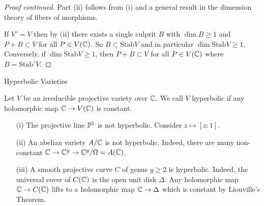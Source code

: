 \documentclass{beamer}
\begin{document}
\begin{frame}
  \begin{proof}[Proof continued]
    Part (ii) follows from (i) and a general result in the 
    dimension theory of fibers of morphisms. 

    If $V^{\circ}=V$ then by (ii) there exists a single culprit $B$ with
    $\dim B\ge 1$ and 
    $P+B\subset V$ for all $P\in V({\mathbb{C}})$. So $B\subset
    \mathrm{Stab} V$ and in particular $\dim \mathrm{Stab}V\ge 1$.
    Conversely, if $\dim \mathrm{Stab} V \ge 1$, then $P+B\subset V$
    for all $P\in V({\mathbb{C}})$ where $B=\mathrm{Stab}^{\circ} V$. 
  \end{proof}
\end{frame}

\begin{frame}{Hyperbolic Varieties}
  \begin{definition}
    Let $V$ be an irreducible projective variety over ${\mathbb{C}}$.
    We call $V$ \alert{hyperbolic} if
    any holomorphic map ${\mathbb{C}} \rightarrow V({\mathbb{C}})$ is
    constant.
  \end{definition}

  \begin{example}
    \begin{enumerate}
    \item [(i)]    The projective line ${\mathbb{P}}^1$ is \alert{not} hyperbolic. Consider
    $z\mapsto [z:1]$.
    \item[(ii)] An abelian variety $A/{\mathbb{C}}$ is \alert{not} hyperbolic.
      Indeed, there are many non-constant
      ${\mathbb{C}}\rightarrow {\mathbb{C}}^g\rightarrow {\mathbb{C}}^g/\Omega =A({\mathbb{C}})$. 
    \item[(iii)] A smooth projective curve $C$ of genus $g\ge 2$ is
      hyperbolic. Indeed, the universal cover of $C({\mathbb{C}})$ is the open
      unit disk $\Delta$.
      Any holomorphic map ${\mathbb{C}}\rightarrow C({\mathbb{C}})$ lifts to a
      holomorphic map ${\mathbb{C}}\rightarrow\Delta$ which is constant by
      Liouville's Theorem.
    \end{enumerate}
  \end{example}
\end{frame}
\end{document}
